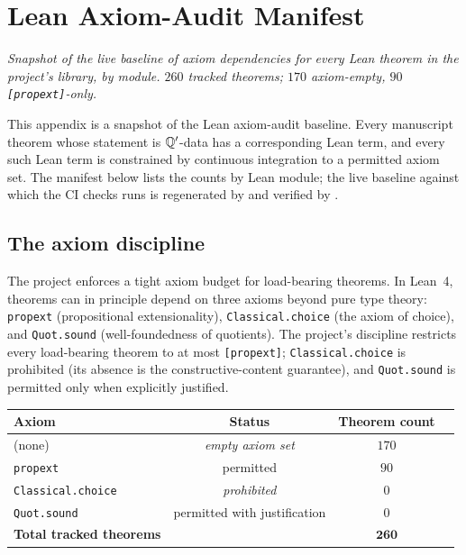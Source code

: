 %

\chapter{Lean Axiom-Audit Manifest}
\label{ch:appx-lean-audit}

\noindent\emph{Snapshot of the live baseline of axiom dependencies
for every Lean theorem in the project's library, by module.
$260$ tracked theorems; $170$ axiom-empty, $90$ \texttt{[propext]}-only.}

This appendix is a snapshot of the Lean axiom-audit baseline.  Every
manuscript theorem whose statement is $\mathbb{Q}'$-data has a corresponding
Lean term, and every such Lean term is constrained by continuous
integration to a permitted axiom set.  The manifest below lists the
counts by Lean module; the live baseline against which the CI
checks runs is regenerated by
 and verified by
.

\section{The axiom discipline}
\label{sec:audit-discipline}

%

The project enforces a tight axiom budget for load-bearing
theorems.  In Lean~4, theorems can in principle depend on three
axioms beyond pure type theory: \texttt{propext} (propositional
extensionality), \texttt{Classical.choice} (the axiom of choice),
and \texttt{Quot.sound} (well-foundedness of quotients).  The
project's discipline restricts every load-bearing theorem to at
most \texttt{[propext]}; \texttt{Classical.choice} is prohibited
(its absence is the constructive-content guarantee), and
\texttt{Quot.sound} is permitted only when explicitly justified.

\begin{infobox}[main][title=Permitted axiom budget]
\begin{center}
\renewcommand{\arraystretch}{1.2}
\begin{tabular}{lccc}
\toprule
Axiom                   & Status                        & Theorem count \\
\midrule
(none)                  & \emph{empty axiom set}        & $170$ \\
\texttt{propext}        & permitted                     & $90$  \\
\texttt{Classical.choice} & \emph{prohibited}            & $0$   \\
\texttt{Quot.sound}     & permitted with justification  & $0$   \\
\midrule
\textbf{Total tracked theorems} &                       & $\mathbf{260}$ \\
\bottomrule
\end{tabular}
\end{center}
\end{infobox}

